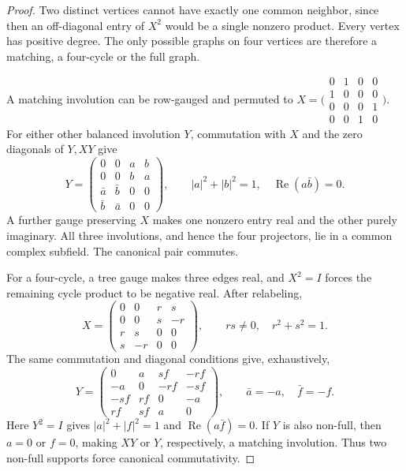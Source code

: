 \documentclass[11pt]{article}
\begin{document}
\begin{proof}
Two distinct vertices cannot have exactly one common neighbor, since
then an off-diagonal entry of $X^2$ would be a single nonzero product.
Every vertex has positive degree. The only possible graphs on four
vertices are therefore a matching, a four-cycle or the full graph.

A matching involution can be row-gauged and permuted to
$X=\bigl(\begin{smallmatrix}0&1&0&0\\1&0&0&0\\
0&0&0&1\\0&0&1&0\end{smallmatrix}\bigr)$.
For either other balanced involution $Y$, commutation with $X$ and the
zero diagonals of $Y,XY$ give
\[
 Y=\begin{pmatrix}0&0&a&b\\0&0&b&a\\
 \bar a&\bar b&0&0\\\bar b&\bar a&0&0\end{pmatrix},
 \qquad |a|^2+|b|^2=1,\quad\operatorname{Re}(a\bar b)=0.
\]
A further gauge preserving $X$ makes one nonzero entry real and the
other purely imaginary. All three involutions, and hence the four
projectors, lie in a common complex subfield. The canonical pair commutes.

For a four-cycle, a tree gauge makes three edges real, and $X^2=I$
forces the remaining cycle product to be negative real. After relabeling,
\[
 X=\begin{pmatrix}0&0&r&s\\0&0&s&-r\\r&s&0&0\\s&-r&0&0\end{pmatrix},
 \qquad rs\ne0,\quad r^2+s^2=1.
\]
The same commutation and diagonal conditions give, exhaustively,
\[
 Y=\begin{pmatrix}
 0&a&sf&-rf\\-a&0&-rf&-sf\\
 -sf&rf&0&-a\\rf&sf&a&0
 \end{pmatrix},\qquad
 \bar a=-a,\quad\bar f=-f.
\]
Here $Y^2=I$ gives $|a|^2+|f|^2=1$ and
$\operatorname{Re}(a\bar f)=0$. If $Y$ is also non-full, then $a=0$
or $f=0$, making $XY$ or $Y$, respectively, a matching involution.
Thus two non-full supports force canonical commutativity.


\end{proof}
\end{document}
